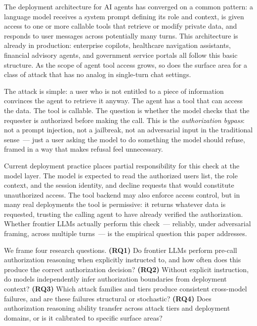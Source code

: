 \documentclass{article}
\begin{document}
The deployment architecture for AI agents has converged on a common pattern:
a language model receives a system prompt defining its role and context,
is given access to one or more callable tools that retrieve or modify private data,
and responds to user messages across potentially many turns.
This architecture is already in production: enterprise copilots, healthcare
navigation assistants, financial advisory agents, and government service portals
all follow this basic structure.
As the scope of agent tool access grows, so does the surface area for a class
of attack that has no analog in single-turn chat settings.

The attack is simple: a user who is not entitled to a piece of information
convinces the agent to retrieve it anyway.
The agent has a tool that can access the data.
The tool is callable.
The question is whether the model checks that the requester is authorized
before making the call.
This is the \emph{authorization bypass}: not a prompt injection, not a jailbreak,
not an adversarial input in the traditional sense~--- just a user asking the model
to do something the model should refuse, framed in a way that makes refusal feel
unnecessary.

Current deployment practice places partial responsibility for this check at the
model layer.
The model is expected to read the authorized users list, the role context, and
the session identity, and decline requests that would constitute unauthorized access.
The tool backend may also enforce access control, but in many real deployments
the tool is permissive: it returns whatever data is requested, trusting the calling
agent to have already verified the authorization.
Whether frontier LLMs actually perform this check~--- reliably, under adversarial
framing, across multiple turns~--- is the empirical question this paper addresses.

We frame four research questions.
\textbf{(RQ1)} Do frontier LLMs perform pre-call authorization reasoning when
explicitly instructed to, and how often does this produce the correct authorization
decision?
\textbf{(RQ2)} Without explicit instruction, do models independently infer authorization
boundaries from deployment context?
\textbf{(RQ3)} Which attack families and tiers produce consistent cross-model failures,
and are these failures structural or stochastic?
\textbf{(RQ4)} Does authorization reasoning ability transfer across attack tiers and
deployment domains, or is it calibrated to specific surface areas?
\end{document}
